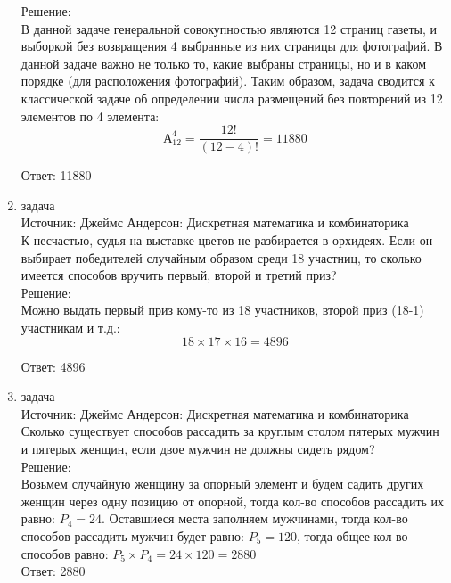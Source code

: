 \documentclass[a4paper,14pt]{extreport} %
\begin{document}
\begin{center}
\begin{enumerate}
						 Решение:\\
						 В данной задаче генеральной совокупностью являются
						 12 страниц газеты, и выборкой без возвращения 4 выбранные из них
						 страницы для фотографий. В данной задаче важно не только то, какие
						 выбраны страницы, но и в каком порядке (для расположения
						 фотографий). Таким образом, задача сводится к классической задаче об
						 определении числа размещений без повторений из 12 элементов по 4
						 элемента:
						 \begin{equation}
						 	А_{12}^4 = \frac{12!}{(12-4)!} = 11880
						 \end{equation}
						 
						 Ответ: 11880
						 
						 \newpage
						  \item {\large задача  }\\
						 Источник: Джеймс Андерсон: Дискретная математика и комбинаторика\\
						 \vspace{15pt}
						 К несчастью, судья на выставке цветов не разбирается в орхидеях. Если он
						 выбирает победителей случайным образом среди 18 участниц, то сколько
						 имеется способов вручить первый, второй и третий приз?\\
						 \vspace{15pt}
						 Решение:\\
						 Можно выдать первый приз кому-то из 18 участников, второй приз (18-1) участникам и т.д.:
						 \begin{equation}
						 	18 \times 17 \times 16 = 4896
						 \end{equation}
						 
						 Ответ: 4896
						 
						 
						  \item {\large задача  }\\
						 Источник: Джеймс Андерсон: Дискретная математика и комбинаторика\\
						 \vspace{15pt}
						 Сколько существует способов рассадить за круглым столом пятерых мужчин
						 и пятерых женщин, если двое мужчин не должны сидеть рядом?
						 \\
						 \vspace{15pt}
						 Решение:\\
						 Возьмем случайную женщину за опорный элемент и будем садить других женщин через одну позицию от опорной, тогда кол-во способов рассадить их равно: $P_4 = 24$. Оставшиеся места заполняем мужчинами, тогда кол-во способов рассадить мужчин будет равно:
						 $P_5 = 120$, тогда общее кол-во способов равно: $P_5 \times P_4 = 24 \times 120 = 2880$\\
						 Ответ: 2880
						 

\end{enumerate}
\end{center}
\end{document}
